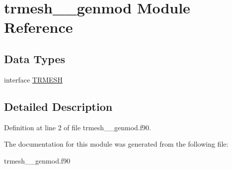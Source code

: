 \hypertarget{classtrmesh____genmod}{\section{trmesh\+\_\+\+\_\+genmod Module Reference}
\label{classtrmesh____genmod}
}
\subsection*{Data Types}
\begin{DoxyCompactItemize}
\item 
interface \hyperlink{interfacetrmesh____genmod_1_1_t_r_m_e_s_h}{T\+R\+M\+E\+S\+H}
\end{DoxyCompactItemize}


\subsection{Detailed Description}


Definition at line 2 of file trmesh\+\_\+\+\_\+genmod.\+f90.



The documentation for this module was generated from the following file\+:\begin{DoxyCompactItemize}
\item 
trmesh\+\_\+\+\_\+genmod.\+f90\end{DoxyCompactItemize}
